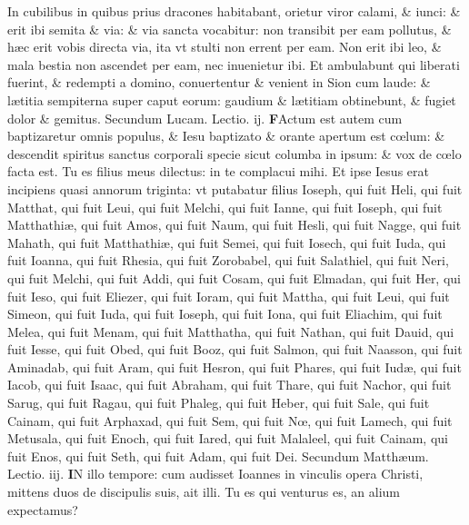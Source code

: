 \documentclass[a5paper,10pt]{book}
\def\leftmarginnote{%
	\lrmarginnote{\hskip -\marginparsep \hskip -6.5em}}
\def\rightmarginnote{%
	\lrmarginnote{\hskip\columnwidth \hskip -1em}}
\def\ae{æ}
\def\oe{œ}
\begin{document}
\begin{multicols*}{2}
In\rightmarginnote{B} cubilibus in quibus prius dracones habitabant, orietur viror calami, \& iunci: \& erit ibi semita \& via: \& via sancta vocabitur: non transibit per eam pollutus, \& h\ae c erit vobis directa via, ita vt stulti non errent per eam.
Non erit ibi leo, \& mala bestia non ascendet per eam, nec inuenietur ibi.
Et ambulabunt qui liberati fuerint, \& redempti a domino, conuertentur \& venient in Sion cum laude: \& l\ae titia sempiterna super caput eorum: gaudium \& l\ae titiam obtinebunt, \& fugiet dolor \& gemitus.
\newline \color{red} Secundum Lucam. \hfill Lectio. ij. \color{black}
\vspace{-.25em}
\lettrine[lines=2]{\bfseries \color{red} F}{}Actum\rightmarginnote{ca. 3.} est autem cum baptizaretur omnis populus, \& Iesu baptizato \& orante apertum est c\oe lum: \& descendit spiritus sanctus corporali specie sicut columba in ipsum: \& vox de c\oe lo facta est.
Tu es filius meus dilectus: in te complacui mihi.
Et ipse Iesus erat incipiens quasi annorum triginta: vt putabatur filius Ioseph, qui fuit Heli, qui fuit Matthat, qui fuit Leui, qui fuit Melchi,
qui fuit Ianne, qui fuit Ioseph, qui fuit Matthathi\ae , qui fuit Amos, qui fuit Naum, qui fuit Hesli, qui fuit Nagge, qui fuit Mahath, qui fuit Matthathi\ae , qui fuit Semei, qui fuit Iosech, qui fuit Iuda, qui fuit Ioanna, qui fuit Rhesia, qui fuit Zorobabel, qui fuit Salathiel, qui fuit Neri, qui fuit Melchi, qui fuit Addi, qui fuit Cosam, qui fuit Elmadan, qui fuit Her, qui fuit Ieso, qui fuit Eliezer, qui fuit Ioram, qui fuit Mattha, qui fuit Leui, qui fuit Simeon, qui fuit Iuda, qui fuit Ioseph, qui fuit Iona, qui fuit Eliachim, qui fuit Melea, qui fuit Menam, qui fuit Matthatha, qui fuit Nathan, qui fuit Dauid, qui fuit Iesse, qui fuit Obed, qui fuit Booz, qui fuit Salmon, qui fuit Naasson, qui fuit Aminadab, qui fuit Aram, qui fuit Hesron, qui fuit Phares, qui fuit Iud\ae , qui fuit Iacob, qui fuit Isaac, qui fuit Abraham, qui fuit Thare, qui fuit Nachor, qui fuit Sarug, qui fuit Ragau, qui fuit Phaleg, qui fuit Heber, qui fuit Sale, qui fuit Cainam, qui fuit Arphaxad, qui fuit Sem, qui fuit N\oe , qui fuit Lamech, qui fuit Metusala, qui fuit Enoch, qui fuit Iared, qui fuit Malaleel, qui fuit Cainam, qui fuit Enos, qui fuit Seth, qui fuit Adam, qui fuit Dei.
\newline \color{red} Secundum Matth\ae um. \hfill Lectio. iij. \color{black}
\vspace{-.25em}
\lettrine[lines=2]{\bfseries \color{red} I}{}N\leftmarginnote{\begin{flushright}c. 11.\end{flushright}} illo tempore: cum audisset Ioannes in vinculis opera Christi, mittens duos de discipulis suis, ait illi. Tu es qui venturus es, an alium expectamus?

\end{multicols*}
\end{document}
